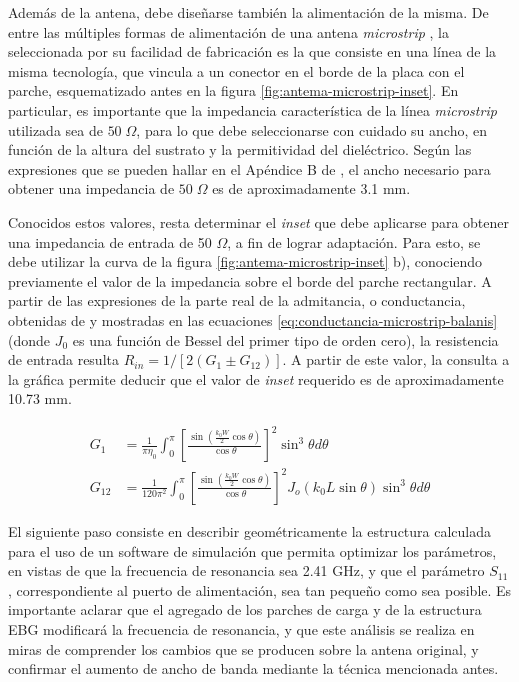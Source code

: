 Además de la antena, debe diseñarse también la alimentación de la misma. De entre las múltiples formas de alimentación de una antena \textit{microstrip} \cite{Barthia:Handbook}, la seleccionada por su facilidad de fabricación es la que consiste en una línea de la misma tecnología, que vincula a un conector en el borde de la placa con el parche, esquematizado antes en la figura \ref{fig:antema-microstrip-inset}. En particular, es importante que la impedancia característica de la línea \textit{microstrip} utilizada sea de $50\;\Omega$, para lo que debe seleccionarse con cuidado su ancho, en función de la altura del sustrato y la permitividad del dieléctrico. Según las expresiones que se pueden hallar en el Apéndice B de \cite{Barthia:Handbook}, el ancho necesario para obtener una impedancia de $50\;\Omega$ es de aproximadamente 3.1 mm.

Conocidos estos valores, resta determinar el \textit{inset} que debe aplicarse para obtener una impedancia de entrada de 50 $\Omega$, a fin de lograr adaptación. Para esto, se debe utilizar la curva de la figura \ref{fig:antema-microstrip-inset} b), conociendo previamente el valor de la impedancia sobre el borde del parche rectangular. A partir de las expresiones de la parte real de la admitancia, o conductancia, obtenidas de \cite{Balanis:Theory} y mostradas en las ecuaciones \ref{eq:conductancia-microstrip-balanis} (donde $J_0$ es una función de Bessel del primer tipo de orden cero), la resistencia de entrada resulta $R_{in} = 1/[2(G_1 \pm G_{12})]$. A partir de este valor, la consulta a la gráfica permite deducir que el valor de \textit{inset} requerido es de aproximadamente 10.73 mm.

\begin{align}
	\label{eq:conductancia-microstrip-balanis}
	G_1 &= \frac{1}{\pi \eta_0} \int_0^\pi \left[ \frac{\sin \left( \frac{k_0 W}{2} \cos \theta \right) }{\cos \theta}\right]^2 \sin^3 \theta d\theta \\
	G_{12} &= \frac{1}{120 \pi^2} \int_0^{\pi} \left[ \frac{\sin \left( \frac{k_0 W}{2} \cos \theta \right) }{\cos \theta}\right]^2 J_o(k_0 L \sin \theta) \sin^3 \theta d\theta
\end{align}

El siguiente paso consiste en describir geométricamente la estructura calculada para el uso de un software de simulación que permita optimizar los parámetros, en vistas de que la frecuencia de resonancia sea 2.41 GHz, y que el parámetro $S_{11}$, correspondiente al puerto de alimentación, sea tan pequeño como sea posible. Es importante aclarar que el agregado de los parches de carga y de la estructura EBG modificará la frecuencia de resonancia, y que este análisis se realiza en miras de comprender los cambios que se producen sobre la antena original, y confirmar el aumento de ancho de banda mediante la técnica mencionada antes.


